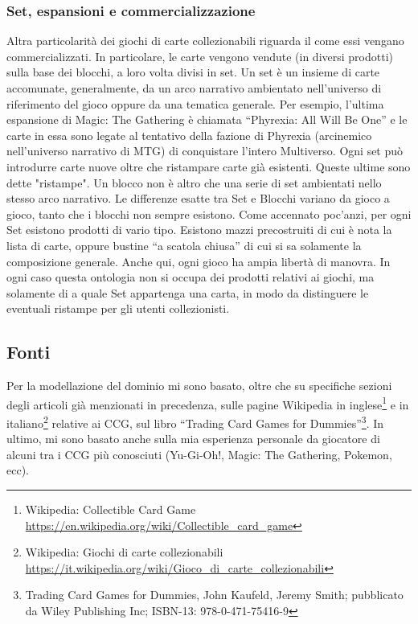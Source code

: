 \documentclass[12pt]{article}
\begin{document}
\subsubsection{Set, espansioni e commercializzazione}
\label{p:set_espansioni}
Altra particolarità dei giochi di carte collezionabili riguarda il come essi vengano commercializzati. In particolare, le carte vengono vendute (in diversi prodotti) sulla base dei blocchi, a loro volta divisi in set. Un set è un insieme di carte accomunate, generalmente, da un arco narrativo ambientato nell’universo di riferimento del gioco oppure da una tematica generale. Per esempio, l’ultima espansione di Magic: The Gathering è chiamata “Phyrexia: All Will Be One” e le carte in essa sono legate al tentativo della fazione di Phyrexia (arcinemico nell’universo narrativo di MTG) di conquistare l’intero Multiverso. Ogni set può introdurre carte nuove oltre che ristampare carte già esistenti. Queste ultime sono dette "ristampe". Un blocco non è altro che una serie di set ambientati nello stesso arco narrativo. Le differenze esatte tra Set e Blocchi variano da gioco a gioco, tanto che i blocchi non sempre esistono. \newline
Come accennato poc’anzi, per ogni Set esistono prodotti di vario tipo. Esistono mazzi precostruiti di cui è nota la lista di carte, oppure bustine “a scatola chiusa” di cui si sa solamente la composizione generale. Anche qui, ogni gioco ha ampia libertà di manovra. In ogni caso questa ontologia non si occupa dei prodotti relativi ai giochi, ma solamente di a quale Set appartenga una carta, in modo da distinguere le eventuali ristampe per gli utenti collezionisti.

\subsection{Fonti}
Per la modellazione del dominio mi sono basato, oltre che su specifiche sezioni degli articoli già menzionati in precedenza, sulle pagine Wikipedia in inglese\footnote{Wikipedia: Collectible Card Game \url{https://en.wikipedia.org/wiki/Collectible_card_game}} e in italiano\footnote{Wikipedia: Giochi di carte collezionabili \url{https://it.wikipedia.org/wiki/Gioco_di_carte_collezionabili}} relative ai CCG, sul libro “Trading Card Games for Dummies”\footnote{Trading Card Games for Dummies, John Kaufeld, Jeremy Smith; pubblicato da Wiley Publishing Inc; ISBN-13: 978-0-471-75416-9}. In ultimo, mi sono basato anche sulla mia esperienza personale da giocatore di alcuni tra i CCG più conosciuti (Yu-Gi-Oh!, Magic: The Gathering, Pokemon, ecc).
\newpage
\end{document}
